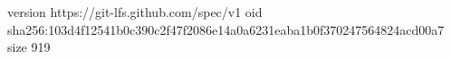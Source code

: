 version https://git-lfs.github.com/spec/v1
oid sha256:103d4f12541b0c390c2f47f2086e14a0a6231eaba1b0f370247564824acd00a7
size 919
